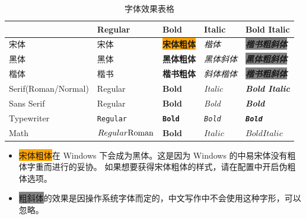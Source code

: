 \begin{table}[htb]
  \centering
  \caption{字体效果表格}
  \begin{tabular}{@{}lllll@{}}
    \toprule
                        & Regular                               & Bold                             & Italic                 & Bold Italic                                       \\ \midrule
    宋体                  & 宋体                                    & \colorbox{orange}{\textbf{宋体粗体}} & \textit{楷体}            & \colorbox{gray}{\textbf{\textit{楷书粗斜体}}}          \\
    黑体                  & {\heiti{}黑体}                          & \textbf{\heiti{}黑体粗体}            & \textit{\heiti{}黑体斜体}  & \colorbox{gray}{\textit{\textbf{\heiti{}黑体粗斜体}}}  \\
    楷体                  & {\kaishu{}楷书}                         & \textbf{\kaishu{}楷书粗体}           & \textit{\kaishu{}斜体楷体} & \colorbox{gray}{\textbf{\textit{\kaishu{}楷书粗斜体}}} \\
    Serif(Roman/Normal) & Regular                               & \textbf{Bold}                    & \textit{Italic}        & \textbf{\textit{Bold Italic}}                     \\
    Sans Serif          & \textsf{Regular}                      & \textbf{\textsf{Bold}}           & \textit{\textsf{Bold}} & \textbf{\textit{\textsf{Bold}}}                   \\
    Typewriter          & \texttt{Regular}                      & \textbf{\texttt{Bold}}           & \textit{\texttt{Bold}} & \textbf{\textit{\texttt{Bold}}}                   \\
    Math                & $\mathnormal{Regular} \mathrm{Roman}$ & $\mathbf{Bold}$                  & $\mathit{Italic}$      & $\mathbf{\mathit{Bold Italic}}$                   \\ \bottomrule
  \end{tabular}
\end{table}

\begin{itemize}[nosep]
  \item \colorbox{orange}{宋体粗体}在 Windows 下会成为黑体。这是因为 Windows 的中易宋体没有粗体字重而进行的妥协。
        如果想要获得宋体粗体的样式，请在配置中开启伪粗体选项。
  \item \colorbox{gray}{粗斜体}的效果是因操作系统字体而定的，中文写作中不会使用这种字形，可以忽略。
\end{itemize}

